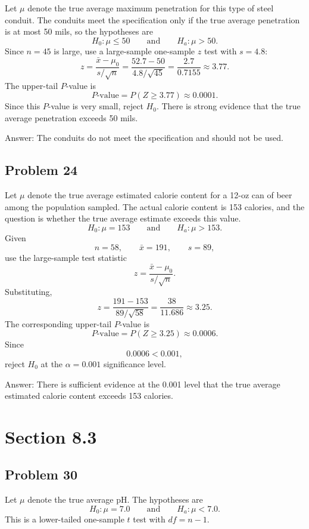 \documentclass[11pt]{article}
\begin{document}
Let $\mu$ denote the true average maximum penetration for this type of steel conduit. The conduits meet the specification only if the true average penetration is at most 50 mils, so the hypotheses are
\[
H_0:\mu\le 50
\qquad \text{and} \qquad
H_a:\mu>50.
\]
Since $n=45$ is large, use a large-sample one-sample $z$ test with $s=4.8$:
\[
z=\frac{\bar{x}-\mu_0}{s/\sqrt{n}}
=\frac{52.7-50}{4.8/\sqrt{45}}
=\frac{2.7}{0.7155}
\approx 3.77.
\]
The upper-tail $P$-value is
\[
P\text{-value}=P(Z\ge 3.77)\approx 0.0001.
\]
Since this $P$-value is very small, reject $H_0$. There is strong evidence that the true average penetration exceeds 50 mils.

Answer: The conduits do not meet the specification and should not be used.

\subsection*{Problem 24}

Let $\mu$ denote the true average estimated calorie content for a 12-oz can of beer among the population sampled. The actual calorie content is 153 calories, and the question is whether the true average estimate exceeds this value.
\[
H_0:\mu=153
\qquad \text{and} \qquad
H_a:\mu>153.
\]
Given
\[
n=58,
\qquad \bar{x}=191,
\qquad s=89,
\]
use the large-sample test statistic
\[
z=\frac{\bar{x}-\mu_0}{s/\sqrt{n}}.
\]
Substituting,
\[
z=\frac{191-153}{89/\sqrt{58}}
=\frac{38}{11.686}
\approx 3.25.
\]
The corresponding upper-tail $P$-value is
\[
P\text{-value}=P(Z\ge 3.25)\approx 0.0006.
\]
Since
\[
0.0006<0.001,
\]
reject $H_0$ at the $\alpha=0.001$ significance level.

Answer: There is sufficient evidence at the 0.001 level that the true average estimated calorie content exceeds 153 calories.

\section*{Section 8.3}

\subsection*{Problem 30}

Let $\mu$ denote the true average pH. The hypotheses are
\[
H_0:\mu=7.0
\qquad \text{and} \qquad
H_a:\mu<7.0.
\]
This is a lower-tailed one-sample $t$ test with $df=n-1$.
\end{document}

